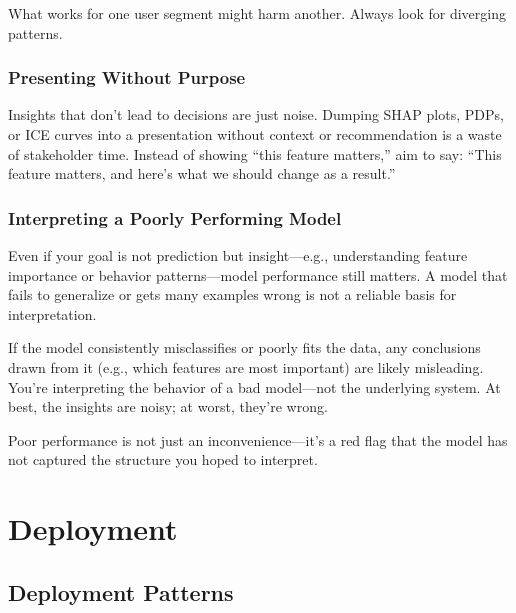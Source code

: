 \documentclass[12pt,openany]{book}
\begin{document}
\begin{notebox}
What works for one user segment might harm another. Always look for diverging patterns.
\end{notebox}



\section{Presenting Without Purpose}

Insights that don’t lead to decisions are just noise. Dumping SHAP plots, PDPs, or ICE curves into a presentation without context or recommendation is a waste of stakeholder time. Instead of showing “this feature matters,” aim to say: “This feature matters, and here’s what we should change as a result.”



\section{Interpreting a Poorly Performing Model}

Even if your goal is not prediction but insight—e.g., understanding feature importance or behavior patterns—model performance still matters. A model that fails to generalize or gets many examples wrong is not a reliable basis for interpretation. \newline

If the model consistently misclassifies or poorly fits the data, any conclusions drawn from it (e.g., which features are most important) are likely misleading. You're interpreting the behavior of a bad model—not the underlying system. At best, the insights are noisy; at worst, they're wrong. \newline

Poor performance is not just an inconvenience—it’s a red flag that the model has not captured the structure you hoped to interpret.





\part{Deployment}




\chapter{Deployment Patterns}
\end{document}
